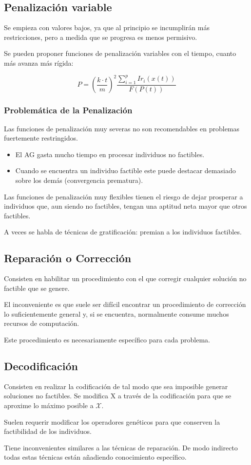 \documentclass[12pt, twoside, openright]{report} %
\begin{document}
\subsection{Penalización variable}
Se empieza con valores bajos, ya que al principio se incumplirán más restricciones, pero a medida que se progresa es menos permisivo.

Se pueden proponer funciones de penalización variables con el tiempo, cuanto más avanza más rígida: 

$$P = \left(\frac {k \cdot t} {m} \right)^2 \frac {\sum^p_{i=1} Ir_i(x(t))} {F(P(t))}$$

\subsubsection{Problemática de la Penalización}
Las funciones de penalización muy severas no son recomendables en problemas fuertemente restringidos.
\begin{itemize}
	\item El AG gasta mucho tiempo en procesar individuos no factibles.
	\item Cuando se encuentra un individuo factible este puede destacar demasiado sobre los demás (convergencia prematura).
\end{itemize}

Las funciones de penalización muy flexibles tienen el riesgo de dejar prosperar a individuos que, aun siendo no factibles, tengan una aptitud neta mayor que otros factibles.

A veces se habla de técnicas de gratificación: premian a los individuos factibles.

\subsection{Reparación o Corrección}
Consisten en habilitar un procedimiento con el que corregir cualquier solución no factible que se genere.

El inconveniente es que suele ser difícil encontrar un procedimiento de corrección lo suficientemente general y, si se encuentra, normalmente consume muchos recursos de computación.

Este procedimiento es necesariamente específico para cada problema.

\subsection{Decodificación}
Consisten en realizar la codificación de tal modo que sea imposible generar soluciones no factibles. Se modifica X a través de la codificación para que se aproxime lo máximo posible a $\mathcal{X}$.

Suelen requerir modificar los operadores genéticos para que conserven la factibilidad de los individuos.

Tiene inconvenientes similares a las técnicas de reparación. De modo indirecto todas estas técnicas están añadiendo conocimiento específico.
\end{document}
